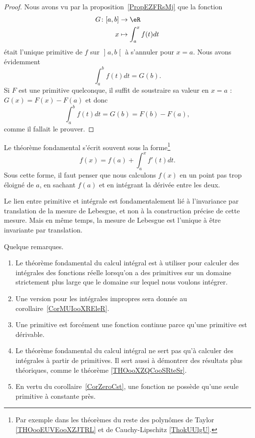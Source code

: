 \begin{proof}
    Nous avons vu par la proposition~\ref{PropEZFRsMj} que la fonction
    \begin{equation}
        \begin{aligned}
            G\colon \mathopen[ a , b \mathclose]&\to \eR \\
            x&\mapsto  \int_a^xf(t)dt
        \end{aligned}
    \end{equation}
    était l'unique primitive de \( f\) sur \( \mathopen] a , b \mathclose[\) à s'annuler pour \( x=a\). Nous avons évidemment
    \begin{equation}
        \int_a^bf(t)dt=G(b).
    \end{equation}
    Si \( F\) est une primitive quelconque, il suffit de soustraire sa valeur en \( x=a\) : \( G(x)=F(x)-F(a)\) et donc
    \begin{equation}
        \int_a^bf(t)dt=G(b)=F(b)-F(a),
    \end{equation}
    comme il fallait le prouver.
\end{proof}

Le théorème fondamental s'écrit souvent sous la forme\footnote{Par exemple dans les théorèmes du reste des polynômes de Taylor \ref{THOooEUVEooXZJTRL} et de Cauchy-Lipschitz \ref{ThokUUlgU}.}
\begin{equation}        \label{EqooBBCYooNweVrF}
    f(x)=f(a)+\int_a^xf'(t)dt.
\end{equation}
Sous cette forme, il faut penser que nous calculons \( f(x)\) en un point pas trop éloigné de \( a\), en sachant \( f(a)\) et en intégrant la dérivée entre les deux.

\begin{remark}
    Le lien entre primitive et intégrale est fondamentalement lié à l'invariance par translation de la mesure de Lebesgue, et non à la construction précise de cette mesure. Mais en même temps, la mesure de Lebesgue est l'unique à être invariante par translation.
\end{remark}

Quelque remarques.
\begin{enumerate}
    \item
        Le théorème fondamental du calcul intégral est à utiliser pour calculer des intégrales des fonctions réelle lorsqu'on a des primitives sur un domaine strictement plus large que le domaine sur lequel nous voulons intégrer.
    \item
        Une version pour les intégrales impropres sera donnée au corollaire~\ref{CorMUIooXREleR}.
    \item
    Une primitive est forcément une fonction continue parce qu'une primitive est dérivable.
\item
    Le théorème fondamental du calcul intégral ne sert pas qu'à calculer des intégrales à partir de primitives. Il sert aussi à démontrer des résultats plus théoriques, comme le théorème \ref{THOooXZQCooSRteSr}.
    \item
        En vertu du corollaire~\ref{CorZeroCst}, une fonction ne possède qu'une seule primitive à constante près.
\end{enumerate}


